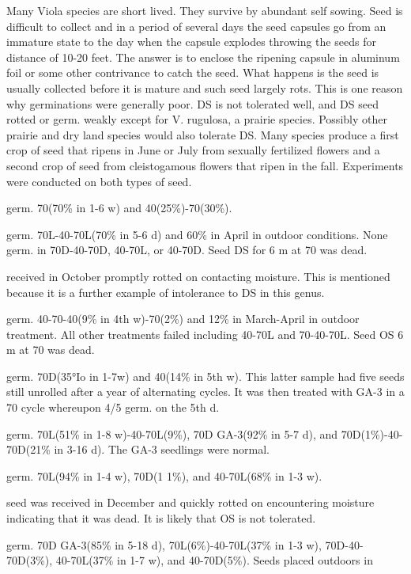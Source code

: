 \begin{description}
Many Viola species are short lived. They survive by abundant self sowing.
Seed is difficult to collect and in a period of several days the seed capsules go from an
immature state to the day when the capsule explodes throwing the seeds for distance
of 10-20 feet. The answer is to enclose the ripening capsule in aluminum foil or some
other contrivance to catch the seed. What happens is the seed is usually collected
before it is mature and such seed largely rots. This is one reason why germinations
were generally poor. DS is not tolerated well, and DS seed rotted or germ. weakly
except for V. rugulosa, a prairie species. Possibly other prairie and dry land species
would also tolerate DS. Many species produce a first crop of seed that ripens in June
or July from sexually fertilized flowers and a second crop of seed from cleistogamous
flowers that ripen in the fall. Experiments were conducted on both types of seed.
\item[V. altaica] germ. 70(70\% in 1-6 w) and 40(25\%)-70(30\%).
\item[V. appalachiensis] germ. 70L-40-70L(70\% in 5-6 d) and 60\% in April in outdoor
conditions. None germ. in 70D-40-70D, 40-70L, or 40-70D. Seed DS for 6 m at 70
was dead.
\item[V. biflora] received in October promptly rotted on contacting moisture. This is
mentioned because it is a further example of intolerance to DS in this genus.
\item[V. canadensis] germ. 40-70-40(9\% in 4th w)-70(2\%) and 12\% in March-April in
outdoor treatment. All other treatments failed including 40-70L and 70-40-70L. Seed
OS 6 m at 70 was dead.
\item[V. cornuta] germ. 70D(35°Io in 1-7w) and 40(14\% in 5th w). This latter sample
had five seeds still unrolled after a year of alternating cycles. It was then treated with
GA-3 in a 70 cycle whereupon 4/5 germ. on the 5th d.
\item[V. cucullata] germ. 70L(51\% in 1-8 w)-40-70L(9\%), 70D GA-3(92\% in 5-7 d),
and 70D(1\%)-40-70D(21\% in 3-16 d). The GA-3 seedlings were normal.
\item[V. dactyloides] germ. 70L(94\% in 1-4 w), 70D(1 1\%), and 40-70L(68\% in 1-3 w).
\item[V. delphinantha] seed was received in December and quickly rotted on
encountering moisture indicating that it was dead. It is likely that OS is not tolerated.
\item[V. fimbriatula] germ. 70D GA-3(85\% in 5-18 d), 70L(6\%)-40-70L(37\% in 1-3 w),
70D-40-70D(3\%), 40-70L(37\% in 1-7 w), and 40-70D(5\%). Seeds placed outdoors in

\end{description}
